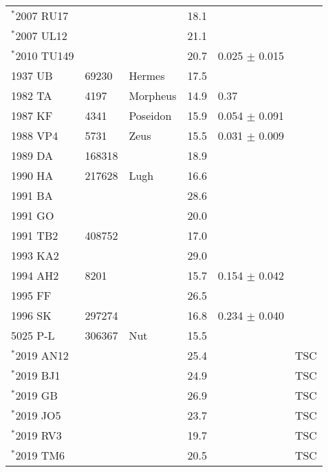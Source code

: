 \documentclass[letters,a4paper,fleqn,usenatbib]{mnras}
\begin{document}
\begin{table*}
{\begin{tabular}{llllll}
  $^*$2007 RU17 &         &     & 18.1    &    & \cite{Brown2010,Jopek2011,Dumitru2017} \\
  $^*$2007 UL12 &         &     & 21.1    &    & \cite{Brown2010,Jopek2011} \\
  $^*$2010 TU149 &        &    & 20.7     & 0.025 $\pm$ 0.015 & \cite{Dumitru2017} \\
  \hline
  1937 UB   & 69230   & Hermes   & 17.5 &    & \cite{Asher1993} \\
  1982 TA   & 4197    & Morpheus & 14.9 & 0.37 & \cite{Asher1993,Babadzhanov2001}\\  
  1987 KF   & 4341    & Poseidon & 15.9 & 0.054 $\pm$ 0.091 & \cite{Asher1993,Babadzhanov2001}\\  
  1988 VP4  & 5731    & Zeus     & 15.5 & 0.031 $\pm$ 0.009 & \cite{Asher1993,Babadzhanov2001}\\
  1989 DA   & 168318  &          & 18.9 &    & \cite{Asher1994} \\
  1990 HA   & 217628  & Lugh     & 16.6 &    & \cite{Asher1993,Babadzhanov2001} \\
  1991 BA   &         &          & 28.6 &    & \cite{Asher1993,Asher1994,Babadzhanov2001}\\ 
  1991 GO   &         &          & 20.0 &    & \cite{Asher1993,Babadzhanov2001} \\
  1991 TB2  & 408752  &          & 17.0 &    & \cite{Babadzhanov2001} \\
  1993 KA2  &         &          & 29.0 &    & \cite{Asher1994,Babadzhanov2001} \\   
  1994 AH2  & 8201    &          & 15.7 & 0.154 $\pm$ 0.042 & \cite{Asher1994,Babadzhanov2001} \\
  1995 FF   &         &          & 26.5 &    & \cite{Babadzhanov2001} \\
  1996 SK   & 297274  &          & 16.8 & 0.234 $\pm$ 0.040 & \cite{Babadzhanov2001} \\
  5025 P-L  &  306367 & Nut      & 15.5 &    & \cite{Olsson1988,Asher1993,Babadzhanov2001} \\
  \hline
  $^*$2019 AN12 &   &  & 25.4 &    & TSC \\
  $^*$2019 BJ1  &   &  & 24.9 &    & TSC \\
  $^*$2019 GB   &   &  & 26.9 &    & TSC \\
  $^*$2019 JO5  &   &  & 23.7 &    & TSC \\
  $^*$2019 RV3  &   &  & 19.7 &    & TSC \\
  $^*$2019 TM6  &   &  & 20.5 &    & TSC \\

\end{tabular}}
\end{table*}
\end{document}
